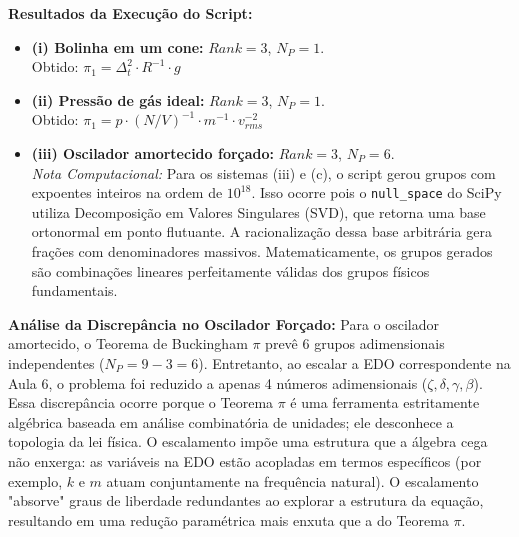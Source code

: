 \documentclass{article}
\begin{document}
\textbf{Resultados da Execução do Script:}
\begin{itemize}
    \item \textbf{(i) Bolinha em um cone:} $Rank = 3$, $N_P = 1$. \\ 
    Obtido: $\pi_1 = \Delta_t^2 \cdot R^{-1} \cdot g$
    \item \textbf{(ii) Pressão de gás ideal:} $Rank = 3$, $N_P = 1$. \\ 
    Obtido: $\pi_1 = p \cdot (N/V)^{-1} \cdot m^{-1} \cdot v_{rms}^{-2}$
    \item \textbf{(iii) Oscilador amortecido forçado:} $Rank = 3$, $N_P = 6$. \\
    \textit{Nota Computacional:} Para os sistemas (iii) e (c), o script gerou grupos com expoentes inteiros na ordem de $10^{18}$. Isso ocorre pois o \texttt{null\_space} do SciPy utiliza Decomposição em Valores Singulares (SVD), que retorna uma base ortonormal em ponto flutuante. A racionalização dessa base arbitrária gera frações com denominadores massivos. Matematicamente, os grupos gerados são combinações lineares perfeitamente válidas dos grupos físicos fundamentais.
\end{itemize}

\textbf{Análise da Discrepância no Oscilador Forçado:}
Para o oscilador amortecido, o Teorema de Buckingham $\pi$ prevê 6 grupos adimensionais independentes ($N_P = 9 - 3 = 6$). Entretanto, ao escalar a EDO correspondente na Aula 6, o problema foi reduzido a apenas 4 números adimensionais ($\zeta, \delta, \gamma, \beta$). 
Essa discrepância ocorre porque o Teorema $\pi$ é uma ferramenta estritamente algébrica baseada em análise combinatória de unidades; ele desconhece a topologia da lei física. O escalamento impõe uma estrutura que a álgebra cega não enxerga: as variáveis na EDO estão acopladas em termos específicos (por exemplo, $k$ e $m$ atuam conjuntamente na frequência natural). O escalamento "absorve" graus de liberdade redundantes ao explorar a estrutura da equação, resultando em uma redução paramétrica mais enxuta que a do Teorema $\pi$.
\end{document}
